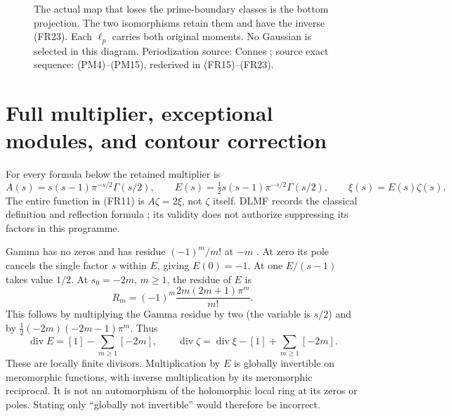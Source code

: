 \documentclass[11pt]{article}
\begin{document}
\begin{figure}[ht]
\centering
{}
\caption{The actual map that loses the prime-boundary classes is the bottom projection. The two isomorphisms retain them and have the inverse (FR23). Each $\ell_p$ carries both original moments. No Gaussian is selected in this diagram. Periodization source: Connes \cite{Connes}; source exact sequence: (PM4)--(PM15), rederived in (FR15)--(FR23).}
\end{figure}

\section{Full multiplier, exceptional modules, and contour correction}
For every formula below the retained multiplier is
\begin{equation}
 A(s)=s(s-1)\pi^{-s/2}\Gamma(s/2),\qquad
 E(s)=\tfrac12s(s-1)\pi^{-s/2}\Gamma(s/2),\qquad
 \xi(s)=E(s)\zeta(s).
 \tag{FR26}
\end{equation}
The entire function in (FR11) is $A\zeta=2\xi$, not $\zeta$ itself. DLMF records the classical definition and reflection formula \cite{DLMFZ}; its validity does not authorize suppressing its factors in this programme.

Gamma has no zeros and has residue $(-1)^m/m!$ at $-m$ \cite{DLMFG}. At zero its pole cancels the single factor $s$ within $E$, giving $E(0)=-1$. At one $E/(s-1)$ takes value $1/2$. At $s_0=-2m$, $m\geq1$, the residue of $E$ is
\begin{equation}
 R_m=(-1)^m\frac{2m(2m+1)\pi^m}{m!}.
 \tag{FR27}
\end{equation}
This follows by multiplying the Gamma residue by two (the variable is $s/2$) and by $\tfrac12(-2m)(-2m-1)\pi^m$. Thus
\begin{equation}
 \operatorname{div}E=[1]-\sum_{m\geq1}[-2m],\qquad
 \operatorname{div}\zeta=\operatorname{div}\xi-[1]+\sum_{m\geq1}[-2m].
 \tag{FR28}
\end{equation}
These are locally finite divisors. Multiplication by $E$ is globally invertible on meromorphic functions, with inverse multiplication by its meromorphic reciprocal. It is not an automorphism of the holomorphic local ring at its zeros or poles. Stating only ``globally not invertible'' would therefore be incorrect.
\end{document}

